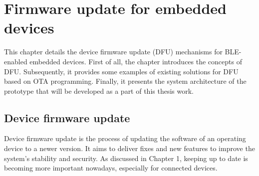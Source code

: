 \section{Firmware update for embedded devices}
\justify
This chapter details the device firmware update (DFU) mechanisms for BLE-enabled
embedded devices. First of all, the chapter introduces the concepts of DFU.
Subsequently, it provides some examples of existing solutions for DFU based 
on OTA programming. Finally, it presents the system architecture of the prototype
that will be developed as a part of this thesis work. 

\subsection{Device firmware update}
\justify
Device firmware update is the process of updating the software of an operating 
device to a newer version. It aims to deliver fixes and new features to improve 
the system's stability and security. As discussed in Chapter 1, keeping up to date
is becoming more important nowadays, especially for connected devices. 

